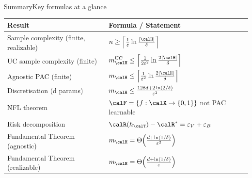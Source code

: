 \begin{frame}{Summary}{Key formulas at a glance}
  \begin{table}
    \centering
    \renewcommand{\arraystretch}{1.55}
    \begin{tabular}{ll}
      \toprule
      \textbf{Result} & \textbf{Formula / Statement}\\
      \midrule
      Sample complexity (finite, realizable)
        & $n \geq \left\lceil\frac{1}{\varepsilon}\ln\frac{|\calH|}{\delta}\right\rceil$\\[2pt]
      UC sample complexity (finite)
        & $m_\calH^{\text{UC}} \leq \left\lceil\frac{1}{2\varepsilon^2}\ln\frac{2|\calH|}{\delta}\right\rceil$\\[2pt]
      Agnostic PAC (finite)
        & $m_\calH \leq \left\lceil\frac{1}{\varepsilon^2}\ln\frac{2|\calH|}{\delta}\right\rceil$\\[2pt]
      Discretisation (d params)
        & $m_\calH \leq \frac{128d + 2\ln(2/\delta)}{\varepsilon^2}$\\[2pt]
      NFL theorem
        & $\calF=\{f:\calX\to\{0,1\}\}$ not PAC learnable\\[2pt]
      Risk decomposition
        & $\calR(h_\calT)-\calR^* = \varepsilon_V + \varepsilon_B$\\[2pt]
      Fundamental Theorem (agnostic)
        & $m_\calH = \Theta\!\left(\frac{d+\ln(1/\delta)}{\varepsilon^2}\right)$\\[2pt]
      Fundamental Theorem (realizable)
        & $m_\calH = \Theta\!\left(\frac{d+\ln(1/\delta)}{\varepsilon}\right)$\\
      \bottomrule
    \end{tabular}
  \end{table}
\end{frame}

%
